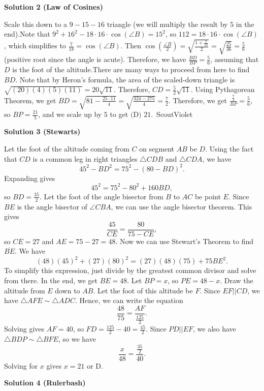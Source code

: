 \begin{enumerate}
\textbf{Solution 2 (Law of Cosines)}

Scale this down to a $9-15-16$ triangle (we will multiply the result by $5$ in the end).Note that $9^2+16^2-18\cdot16\cdot\cos(\angle B) = 15^2$, so $112 = 18 \cdot 16 \cdot \cos(\angle B)$, which simplifies to $\frac{7}{18} = \cos(\angle B)$. Then $\cos(\frac{\angle B}{2}) = \sqrt{\frac{1+\frac{7}{18}}{2}} = \sqrt{\frac{25}{36}} = \frac{5}{6}$ (positive root since the angle is acute). Therefore, we have $\frac{BD}{BP} = \frac{5}{6}$, assuming that $D$ is the foot of the altitude.There are many ways to proceed from here to find $BD$. Note that by Heron's formula, the area of the scaled-down triangle is $\sqrt{(20)(4)(5)(11)} = 20\sqrt{11}$. Therefore, $CD = \frac{5}{2}\sqrt{11}$. Using Pythagorean Theorem, we get $BD= \sqrt{81-\frac{25 \cdot 11}{4}} = \sqrt{\frac{324-275}{4}} = \frac{7}{2}$. Therefore, we get $\frac{\frac{7}{2}}{BP} = \frac{5}{6}$, so $BP = \frac{21}{5}$, and we scale up by $5$ to get $\boxed{\text{(D) }21}$.~ScoutViolet

 



\textbf{Solution 3 (Stewarts)}

Let the foot of the altitude coming from $C$ on segment $AB$ be $D$. Using the fact that $CD$ is a common leg in right triangles $\triangle CDB$ and $\triangle CDA$, we have 
 \[45^2 - BD^2 = 75^2 - (80-BD)^2.\] Expanding gives 
 \[45^2=75^2-80^2+160BD,\] so $BD=\frac{35}{2}.$ Let the foot of the angle bisector from $B$ to $AC$ be point $E$. Since $BE$ is the angle bisector of $\angle CBA$, we can use the angle bisector theorem. This gives 
 \[\frac{45}{CE}=\frac{80}{75-CE},\] so $CE=27$ and $AE=75-27=48$. Now we can use Stewart’s Theorem to find $\overline{BE}$. We have 
 \[(48)(45)^2+(27)(80)^2=(27)(48)(75)+75BE^2.\] To simplify this expression, just divide by the greatest common divisor and solve from there. In the end, we get $BE=48$. Let $BP=x$, so $PE=48-x$. Draw the altitude from $E$ down to $AB$. Let the foot of this altitude be $F$. Since $EF || CD$, we have $\triangle AFE \sim \triangle ADC$. Hence, we can write the equation 
 \[\frac{48}{75}=\frac{AF}{\frac{125}{2}}.\] Solving gives $AF=40$, so $FD=\frac{125}{2}-40=\frac{45}{2}$. Since $PD || EF$, we also have $\triangle BDP \sim \triangle BFE$, so we have 
 \[\frac{x}{48}=\frac{\frac{35}{2}}{40}.\] Solving for $x$ gives $\boxed{x=21}$ or $\boxed{\text{D}}.$




\textbf{Solution 4 (Rulerbash)}


\end{enumerate}
